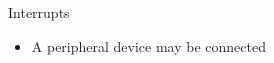 \documentclass[svgnames,x11names]{beamer}
\begin{document}
\begin{frame}{Interrupts}
  \begin{itemize}
  \item A peripheral device may be connected 
  \end{itemize}
\end{frame}

\end{document}
